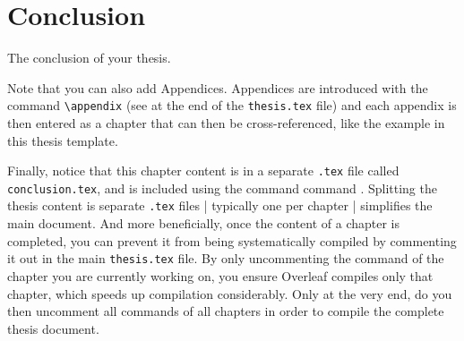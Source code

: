 \chapter{Conclusion}
\label{ch:conclusion}

The conclusion of your thesis.

Note that you can also add Appendices. 
Appendices are introduced with the command \verb|\appendix| (see at the end of the \verb|thesis.tex| file) and each appendix is then entered as a chapter that can then be cross-referenced, like the example  in this thesis template.

Finally, notice that this chapter content is in a separate \verb|.tex| file called \verb|conclusion.tex|, and is included using the command command \verb||.
Splitting the thesis content is separate \verb|.tex| files | typically one per chapter | simplifies the main document. 
And more beneficially, once the content of a chapter is completed, you can prevent it from being systematically compiled by commenting it out in the main \verb|thesis.tex| file. 
By only uncommenting the \verb|| command of the chapter you are currently working on, you ensure Overleaf compiles only that chapter, which speeds up compilation considerably. 
Only at the very end, do you then uncomment all \verb|| commands of all chapters in order to compile the complete thesis document.